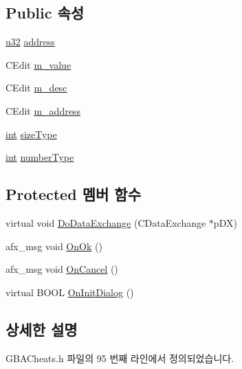 \subsection*{Public 속성}
\begin{DoxyCompactItemize}
\item 
\mbox{\hyperlink{_system_8h_a10e94b422ef0c20dcdec20d31a1f5049}{u32}} \mbox{\hyperlink{class_add_cheat_ae21ae20b0a2e3b936b9ecbacb13a2751}{address}}
\item 
C\+Edit \mbox{\hyperlink{class_add_cheat_aff9c3fd61a088f03dba1eb01e6956286}{m\+\_\+value}}
\item 
C\+Edit \mbox{\hyperlink{class_add_cheat_a644f29b6dd8a0d26d5050054bdf2b054}{m\+\_\+desc}}
\item 
C\+Edit \mbox{\hyperlink{class_add_cheat_a27ec0f498f3827cfc81c19d963c7fef5}{m\+\_\+address}}
\item 
\mbox{\hyperlink{_util_8cpp_a0ef32aa8672df19503a49fab2d0c8071}{int}} \mbox{\hyperlink{class_add_cheat_a7c3af367e51b1812d951dd2d24ac1aa8}{size\+Type}}
\item 
\mbox{\hyperlink{_util_8cpp_a0ef32aa8672df19503a49fab2d0c8071}{int}} \mbox{\hyperlink{class_add_cheat_a50115e7ad42a106db574754cc81bc9a0}{number\+Type}}
\end{DoxyCompactItemize}
\subsection*{Protected 멤버 함수}
\begin{DoxyCompactItemize}
\item 
virtual void \mbox{\hyperlink{class_add_cheat_a9d3dbf5955873700caf71f41fa5117cc}{Do\+Data\+Exchange}} (C\+Data\+Exchange $\ast$p\+DX)
\item 
afx\+\_\+msg void \mbox{\hyperlink{class_add_cheat_ad3785b90d963668a87ff33fb93cf56d9}{On\+Ok}} ()
\item 
afx\+\_\+msg void \mbox{\hyperlink{class_add_cheat_aef14a7fa535621c242e9007a7c0510e7}{On\+Cancel}} ()
\item 
virtual B\+O\+OL \mbox{\hyperlink{class_add_cheat_a92017eb0efe50e09e7c3e5e4980a18cb}{On\+Init\+Dialog}} ()
\end{DoxyCompactItemize}


\subsection{상세한 설명}


G\+B\+A\+Cheats.\+h 파일의 95 번째 라인에서 정의되었습니다.



